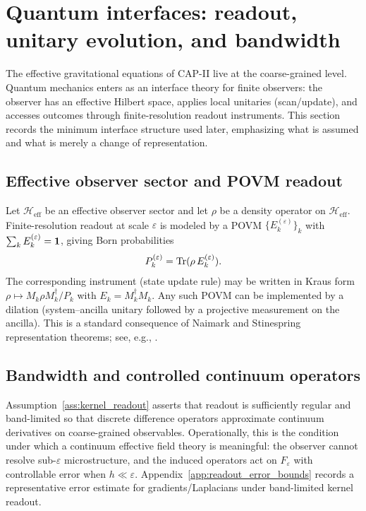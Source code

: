 \section{Quantum interfaces: readout, unitary evolution, and bandwidth}
\label{sec:quantum_interfaces}

The effective gravitational equations of CAP-II live at the coarse-grained level.
Quantum mechanics enters as an interface theory for finite observers: the observer has an effective Hilbert space, applies local unitaries (scan/update), and accesses outcomes through finite-resolution readout instruments.
This section records the minimum interface structure used later, emphasizing what is assumed and what is merely a change of representation.

\subsection{Effective observer sector and POVM readout}
\label{subsec:povm_readout}

Let $\mathcal{H}_{\mathrm{eff}}$ be an effective observer sector and let $\rho$ be a density operator on $\mathcal{H}_{\mathrm{eff}}$.
Finite-resolution readout at scale $\varepsilon$ is modeled by a POVM $\{E_k^{(\varepsilon)}\}_{k}$ with $\sum_k E_k^{(\varepsilon)}=\mathbf{1}$, giving Born probabilities
\begin{equation}
  P_k^{(\varepsilon)}=\mathrm{Tr}(\rho\,E_k^{(\varepsilon)}).
\end{equation}
The corresponding instrument (state update rule) may be written in Kraus form $\rho\mapsto M_k\rho M_k^\dagger/P_k$ with $E_k=M_k^\dagger M_k$.
Any such POVM can be implemented by a dilation (system--ancilla unitary followed by a projective measurement on the ancilla).
This is a standard consequence of Naimark and Stinespring representation theorems; see, e.g., \cite{Naimark1940,Stinespring1955,Kraus1983,NielsenChuang2000}.

\subsection{Bandwidth and controlled continuum operators}
\label{subsec:bandwidth_operators}

Assumption~\ref{ass:kernel_readout} asserts that readout is sufficiently regular and band-limited so that discrete difference operators approximate continuum derivatives on coarse-grained observables.
Operationally, this is the condition under which a continuum effective field theory is meaningful: the observer cannot resolve sub-$\varepsilon$ microstructure, and the induced operators act on $F_\varepsilon$ with controllable error when $h\ll\varepsilon$.
Appendix~\ref{app:readout_error_bounds} records a representative error estimate for gradients/Laplacians under band-limited kernel readout.

